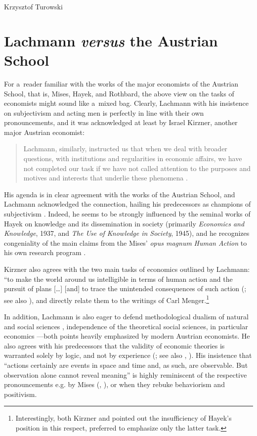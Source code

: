 \begin{artengenv}{Krzysztof Turowski}
\section{Lachmann \emph{versus} the Austrian School}

For a~reader familiar with the works of the major economists of the Austrian School, that is, Mises, Hayek, and Rothbard, the above view on the tasks of economists might sound like a~mixed bag.
Clearly, Lachmann with his insistence on subjectivism and acting men is perfectly in line with their own pronouncements, and it was acknowledged at least by Israel Kirzner, another major Austrian economist:
\begin{quote}
Lachmann, similarly, instructed us that when we deal with broader questions, with institutions and regularities in economic affairs, we have not completed our task if we have not called attention to the purposes and motives and interests that underlie these phenomena \parencite[46]{kirzner-method}.
\end{quote}
His agenda is in clear agreement with the works of the Austrian School, and Lachmann acknowledged the connection, hailing his predecessors as champions of subjectivism \parencite[28]{lachmann-crisis}.
Indeed, he seems to be strongly influenced by the seminal works of Hayek on knowledge and its dissemination in society (primarily \emph{Economics and Knowledge}, 1937, and \emph{The Use of Knowledge in Society}, 1945), and he recognizes congeniality of the main claims from the Mises' \emph{opus magnum} \emph{Human Action} to his own research program \parencite[56--57]{lachmann-kaleidic}.

Kirzner also agrees with the two main tasks of economics outlined by Lachmann: ``to make the world around us intelligible in terms of human action and the pursuit of plans [\ldots] [and] to trace the unintended consequences of such action (\cite[41]{kirzner-method}; see also \cite[261--262]{lachmann-hicks-neo}), and directly relate them to the writings of Carl Menger.\footnote{Interestingly, both Kirzner and \textcite[66--67]{rothbard-praxeology} pointed out the insufficiency of Hayek's position in this respect, preferred to emphasize only the latter task.}

In addition, Lachmann is also eager to defend methodological dualism of natural and social sciences \parencite[167--168]{lachmann-science}, independence of the theoretical social sciences, in particular economics \parencite[59]{lachmann-significance}---both points heavily emphasized by modern Austrian economists.
He also agrees with his predecessors that the validity of economic theories is warranted solely by logic, and not by experience (\cite[58]{lachmann-significance}; see also \cite[41]{mises-ha}, \cite[21, 31--32]{rothbard-praxeology}).
His insistence that ``actions certainly are events in space and time and, as such, are observable. But observation alone cannot reveal meaning'' \parencite[58]{lachmann-significance} is highly reminiscent of the respective pronouncements e.g. by Mises (\citeyear[26]{mises-ha}, \citeyear[245]{mises-theory}), or \textcite[63--64]{hoppe} when they rebuke behaviorism and positivism.


\end{artengenv}
